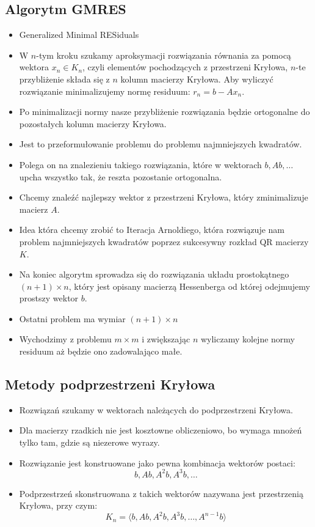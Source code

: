 \documentclass[a4paper]{article}
\begin{document}
\subsection{Algorytm GMRES}
\begin{itemize}
    \item Generalized Minimal RESiduals 
    \item W $n$-tym kroku szukamy aproksymacji rozwiązania równania za pomocą wektora $x_n \in K_n$, czyli elementów pochodzących z przestrzeni Kryłowa, $n$-te przybliżenie składa się z $n$ kolumn macierzy Kryłowa. Aby wyliczyć rozwiązanie minimalizujemy normę residuum: $r_n=b-Ax_n$.
    \item Po minimalizacji normy nasze przybliżenie rozwiązania będzie ortogonalne do pozostałych kolumn macierzy Kryłowa.
    \item Jest to przeformułowanie problemu do problemu najmniejszych kwadratów.
    \item Polega on na znalezieniu takiego rozwiązania, które w wektorach $b, Ab, \dots$ upcha wszystko tak, że reszta pozostanie ortogonalna.
    \item Chcemy znaleźć najlepszy wektor z przestrzeni Kryłowa, który zminimalizuje macierz $A$.
    \item Idea która chcemy zrobić to Iteracja Arnoldiego, która rozwiązuje nam problem najmniejszych kwadratów poprzez sukcesywny rozkład QR macierzy $K$.
    \item Na koniec algorytm sprowadza się do rozwiązania układu prostokątnego $(n+1) \times n$, który jest opisany macierzą Hessenberga od której odejmujemy prostszy wektor $b$.
    \item Ostatni problem ma wymiar $(n+1) \times n$
    \item Wychodzimy z problemu $m \times m$ i zwiększając $n$ wyliczamy kolejne normy residuum aż będzie ono zadowalająco małe.
\end{itemize}

\subsection{Metody podprzestrzeni Kryłowa}
\begin{itemize}
    \item Rozwiązań szukamy w wektorach należących do podprzestrzeni Kryłowa.
    \item Dla macierzy rzadkich nie jest kosztowne obliczeniowo, bo wymaga mnożeń tylko tam, gdzie są niezerowe wyrazy.
    \item Rozwiązanie jest konstruowane jako pewna kombinacja wektorów postaci:
    \begin{equation*}
        b,Ab,A^2b,A^3b, \dots
    \end{equation*}
    \item Podprzestrzeń skonstruowana z takich wektorów nazywana jest przestrzenią Kryłowa, przy czym:
    \begin{equation*}
        K_n= \langle b,Ab,A^2 b,A^3 b, \dots ,A^{n-1} b \rangle
    \end{equation*}
\end{itemize}
\end{document}

